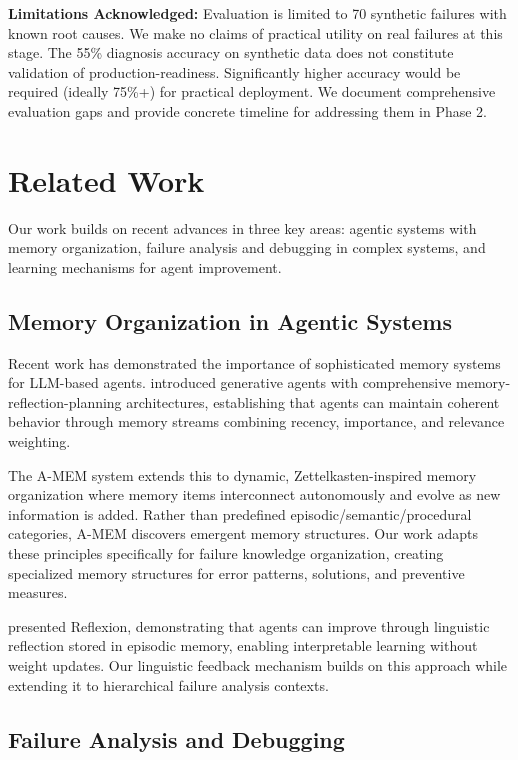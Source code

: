 \documentclass[11pt]{article}
\begin{document}
\textbf{Limitations Acknowledged:} Evaluation is limited to 70 synthetic failures with known root causes. We make no claims of practical utility on real failures at this stage. The 55\% diagnosis accuracy on synthetic data does not constitute validation of production-readiness. Significantly higher accuracy would be required (ideally 75\%+) for practical deployment. We document comprehensive evaluation gaps and provide concrete timeline for addressing them in Phase 2.

\section{Related Work}

Our work builds on recent advances in three key areas: agentic systems with memory organization, failure analysis and debugging in complex systems, and learning mechanisms for agent improvement.

\subsection{Memory Organization in Agentic Systems}

Recent work has demonstrated the importance of sophisticated memory systems for LLM-based agents. \citet{Park2023} introduced generative agents with comprehensive memory-reflection-planning architectures, establishing that agents can maintain coherent behavior through memory streams combining recency, importance, and relevance weighting.

The A-MEM system \citep{AMEM2025} extends this to dynamic, Zettelkasten-inspired memory organization where memory items interconnect autonomously and evolve as new information is added. Rather than predefined episodic/semantic/procedural categories, A-MEM discovers emergent memory structures. Our work adapts these principles specifically for failure knowledge organization, creating specialized memory structures for error patterns, solutions, and preventive measures.

\citet{Shinn2023} presented Reflexion, demonstrating that agents can improve through linguistic reflection stored in episodic memory, enabling interpretable learning without weight updates. Our linguistic feedback mechanism builds on this approach while extending it to hierarchical failure analysis contexts.

\subsection{Failure Analysis and Debugging}
\end{document}
